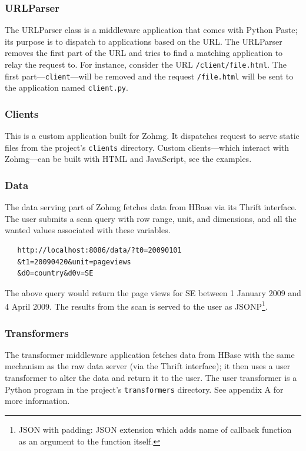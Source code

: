 \subsubsection{URLParser}

The URLParser class is a middleware application that comes with Python Paste;
its purpose is to dispatch to applications based on the URL. The URLParser
removes the first part of the URL and tries to find a matching application to
relay the request to. For instance, consider the URL \texttt{/client/file.html}.
The first part---\texttt{client}---will be removed and the request
\texttt{/file.html} will be sent to the application named \texttt{client.py}.


\subsubsection{Clients}

This is a custom application built for Zohmg. It dispatches request to serve
static files from the project's \texttt{clients} directory. Custom
clients---which interact with Zohmg---can be built with HTML and JavaScript, see
the examples.


\subsubsection{Data}

The data serving part of Zohmg fetches data from HBase via its Thrift interface.
The user submits a scan query with row range, unit, and dimensions, and all the
wanted values associated with these variables.

\begin{verbatim}
   http://localhost:8086/data/?t0=20090101
   &t1=20090420&unit=pageviews
   &d0=country&d0v=SE
\end{verbatim}

The above query would return the page views for SE between 1 January
2009 and 4 April 2009. The results from the scan is served to the user as
JSONP\footnote{JSON with padding: JSON extension which adds name of callback
function as an argument to the function itself.}.


\subsubsection{Transformers}

The transformer middleware application fetches data from HBase with the same
mechanism as the raw data server (via the Thrift interface); it then uses a user
transformer to alter the data and return it to the user. The user transformer is
a Python program in the project's \texttt{transformers} directory. See appendix
A for more information.

